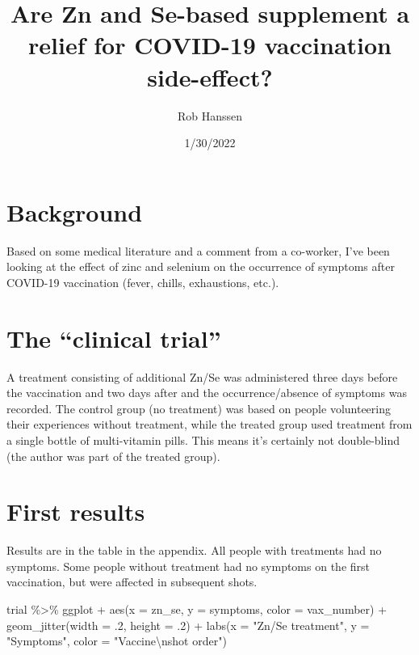 \documentclass[
]{article}
\title{Are Zn and Se-based supplement a relief for COVID-19 vaccination
side-effect?}
\author{Rob Hanssen}
\date{1/30/2022}
\newenvironment{Shaded}{\begin{snugshade}}{\end{snugshade}}
\newcommand{\AttributeTok}[1]{\textcolor[rgb]{0.77,0.63,0.00}{#1}}
\newcommand{\DecValTok}[1]{\textcolor[rgb]{0.00,0.00,0.81}{#1}}
\newcommand{\FunctionTok}[1]{\textcolor[rgb]{0.00,0.00,0.00}{#1}}
\newcommand{\NormalTok}[1]{#1}
\newcommand{\SpecialCharTok}[1]{\textcolor[rgb]{0.00,0.00,0.00}{#1}}
\newcommand{\StringTok}[1]{\textcolor[rgb]{0.31,0.60,0.02}{#1}}
\begin{document}
\maketitle

\hypertarget{background}{%
\section{Background}\label{background}}

Based on some medical literature and a comment from a co-worker, I've
been looking at the effect of zinc and selenium on the occurrence of
symptoms after COVID-19 vaccination (fever, chills, exhaustions, etc.).

\hypertarget{the-clinical-trial}{%
\section{The ``clinical trial''}\label{the-clinical-trial}}

A treatment consisting of additional Zn/Se was administered three days
before the vaccination and two days after and the occurrence/absence of
symptoms was recorded. The control group (no treatment) was based on
people volunteering their experiences without treatment, while the
treated group used treatment from a single bottle of multi-vitamin
pills. This means it's certainly not double-blind (the author was part
of the treated group).

\hypertarget{first-results}{%
\section{First results}\label{first-results}}

Results are in the table in the appendix. All people with treatments had
no symptoms. Some people without treatment had no symptoms on the first
vaccination, but were affected in subsequent shots.

\begin{Shaded}
\begin{Highlighting}[]
\NormalTok{trial }\SpecialCharTok{\%\textgreater{}\%}
\NormalTok{  ggplot }\SpecialCharTok{+}
  \FunctionTok{aes}\NormalTok{(}\AttributeTok{x =}\NormalTok{ zn\_se, }\AttributeTok{y =}\NormalTok{ symptoms, }\AttributeTok{color =}\NormalTok{ vax\_number) }\SpecialCharTok{+} 
  \FunctionTok{geom\_jitter}\NormalTok{(}\AttributeTok{width =}\NormalTok{ .}\DecValTok{2}\NormalTok{, }\AttributeTok{height =}\NormalTok{ .}\DecValTok{2}\NormalTok{) }\SpecialCharTok{+} 
  \FunctionTok{labs}\NormalTok{(}\AttributeTok{x =} \StringTok{"Zn/Se treatment"}\NormalTok{,}
       \AttributeTok{y =} \StringTok{"Symptoms"}\NormalTok{,}
       \AttributeTok{color =} \StringTok{"Vaccine}\SpecialCharTok{\textbackslash{}n}\StringTok{shot order"}\NormalTok{)}
\end{Highlighting}
\end{Shaded}
\end{document}
